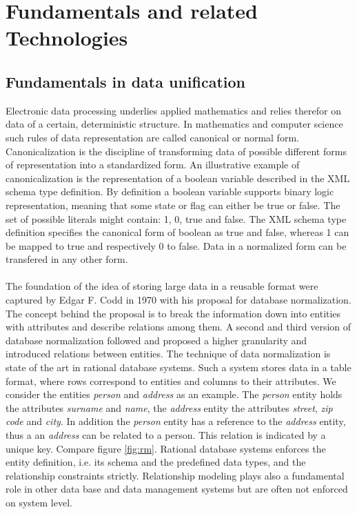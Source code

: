 \chapter{Fundamentals and related Technologies\label{cha:chapter2}}

\section{Fundamentals in data unification\label{sec:unification}}

Electronic data processing underlies applied mathematics and relies therefor on data of a certain, deterministic structure. In mathematics and computer science such rules of data representation are called canonical or normal form. Canonicalization is the discipline of transforming data of possible different forms of representation into a standardized form. An illustrative example of canonicalization is the representation of a boolean variable described in the XML schema type definition\cite{xml_schema_2017}. By definition a boolean variable supports binary logic representation, meaning that some state or flag can either be true or false. The set of possible literals might contain: 1, 0, true and false. The XML schema type definition specifies the canonical form of boolean as true and false, whereas 1 can be mapped to true and respectively 0 to false. Data in a normalized form can be transfered in any other form.
\\\\
The foundation of the idea of storing large data in a reusable format were captured by Edgar F. Codd in 1970 with his proposal for database normalization\cite{codd_1970}. The concept behind the proposal is to break the information down into entities with attributes and describe relations among them. A second and third version of database normalization followed and proposed a higher granularity and introduced relations between entities. The technique of data normalization is state of the art in rational database systems. Such a system stores data in a table format, where rows correspond to entities and columns to their attributes. We consider the entities \textit{person} and \textit{address} as an example. The \textit{person} entity holds the attributes \textit{surname} and \textit{name}, the \textit{address} entity the attributes \textit{street}, \textit{zip code} and \textit{city}. In addition the \textit{person} entity has a reference to the \textit{address} entity, thus a an \textit{address} can be related to a person. This relation is indicated by a unique key. Compare figure \ref{fig:rm}. Rational database systems enforces the entity definition, i.e. its schema and the predefined data types, and the relationship constraints strictly. Relationship modeling plays also a fundamental role in other data base and data management systems but are often not enforced on system level\cite{hills_2016}.

